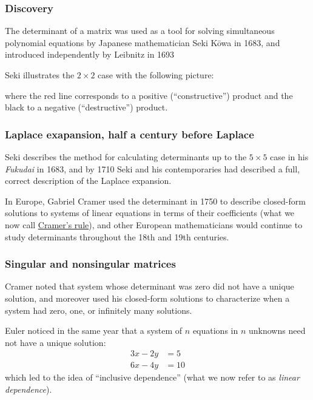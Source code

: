 \documentclass{beamer}
\theoremstyle{definition}
\begin{document}
\begin{frame}
    \frametitle{Discovery}
    
    The determinant of a matrix was used as a tool for solving simultaneous polynomial equations by Japanese mathematician Seki K\={o}wa in 1683\cite{japan-det},
    and introduced independently by Leibnitz in 1693\cite{hist-alg}
    
    \pause
    Seki illustrates the $2\times 2$ case with the following picture:

    \begin{center}
    \end{center}

    where the red line corresponds to a positive (``constructive'') product and the black to a negative (``destructive'') product.
\end{frame}

\begin{frame}
    \frametitle{Laplace exapansion, half a century before Laplace}

    Seki describes the method for calculating determinants up to the $5\times 5$ case in his \textit{Fukudai} in 1683, and by 1710 Seki and his contemporaries
    had described a full, correct description of the Laplace expansion.

    \pause
    In Europe, Gabriel Cramer used the determinant in 1750 to describe closed-form solutions to systems of linear equations in terms of their coefficients
    (what we now call \underline{Cramer's rule}), and other European mathematicians would continue to study determinants throughout the 18th and 19th centuries.
\end{frame}

\begin{frame}
    \frametitle{Singular and nonsingular matrices}
    
    Cramer noted that system whose determinant was zero did not have a unique solution, and moreover used his closed-form solutions to characterize when
    a system had zero, one, or infinitely many solutions.

    Euler noticed in the same year that a system of $n$ equations in $n$ unknowns need not have a unique solution:
    \begin{align*}
        3x-2y &= 5 \\
        6x-4y &= 10
    \end{align*}
    which led to the idea of ``inclusive dependence'' (what we now refer to as \textit{linear dependence})\cite{roots}.
\end{frame}
\end{document}
